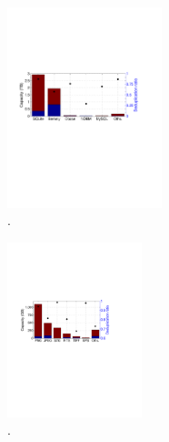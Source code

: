 \begin{figure}
	\centering
	\includegraphics[width=0.4\textwidth]{graphs/dedup-db}
	\caption{.
	}
	\label{fig:dedup-db}
\end{figure}

\begin{figure}
	\centering
	\includegraphics[width=0.35\textwidth]{graphs/dedup-img}
	\caption{.
	}
	\label{fig:dedup-img}
\end{figure}


